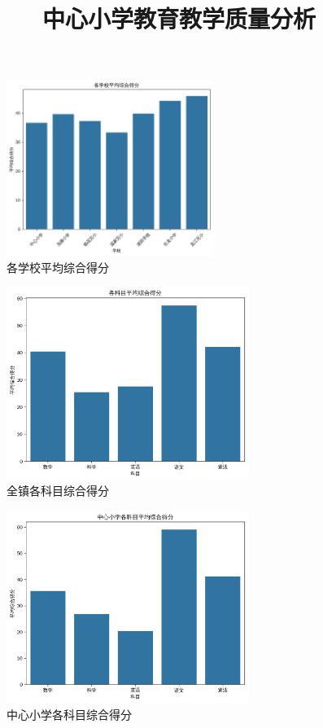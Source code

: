 \documentclass{article}
\title{中心小学教育教学质量分析}
\author{}
\begin{document}
\maketitle



\begin{figure}[H]
    \centering
    \includegraphics[width=0.6\textwidth]{fig/1.png}
    \caption{各学校平均综合得分}
\end{figure}

\begin{figure}[H]
    \centering
    \includegraphics[width=0.7\textwidth]{fig/2.png}
    \caption{全镇各科目综合得分}
\end{figure}

\begin{figure}[H]
    \centering
    \includegraphics[width=0.7\textwidth]{fig/3.png}
    \caption{中心小学各科目综合得分}
\end{figure}
\end{document}
